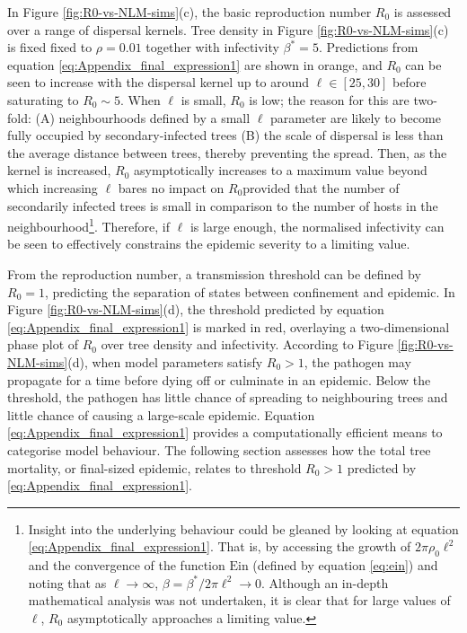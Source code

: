 In Figure \ref{fig:R0-vs-NLM-sims}(c), the basic reproduction number $R_0$ is assessed over a range of dispersal kernels.
Tree density in Figure \ref{fig:R0-vs-NLM-sims}(c) is fixed fixed to $\rho=0.01$ together with infectivity $\beta^*=5$.
Predictions from equation \ref{eq:Appendix_final_expression1} are shown in orange,
and $R_0$ can be seen to increase with the dispersal kernel up to around $\ell \in [25, 30]$ before saturating to $R_0 \sim 5$. 
When $\ell$ is small, $R_0$ is low; the reason for this are two-fold: 
(A) neighbourhoods defined by a small $\ell$ parameter are likely to become fully occupied by secondary-infected trees
(B) the scale of dispersal is less than the average distance between trees, thereby preventing the spread.
Then, as the kernel is increased, $R_0$ asymptotically increases to a maximum value beyond which increasing $\ell$ bares no impact on $R_0$\textemdash provided that the number of secondarily infected trees is small in comparison to the number of hosts in the neighbourhood\footnote{Insight into the underlying behaviour could be gleaned by looking at equation \ref{eq:Appendix_final_expression1}. That is, by accessing the growth of $2\pi \rho_0 \ell^2$ and the convergence of the function $\mathrm{Ein}$ (defined by equation \ref{eq:ein}) and noting that as $\ell \rightarrow \infty$, $\beta=\beta^*/2\pi\ell^2 \rightarrow 0$. Although an in-depth mathematical analysis was not undertaken, it is clear that for large values of $\ell$, $R_0$ asymptotically approaches a limiting value.}.
Therefore, if $\ell$ is large enough, the normalised infectivity can be seen to effectively constrains the epidemic severity to a limiting value.

From the reproduction number, a transmission threshold can be defined by $R_0=1$,  predicting the separation of states between confinement and epidemic.
In Figure \ref{fig:R0-vs-NLM-sims}(d), the threshold predicted by equation \ref{eq:Appendix_final_expression1} is marked in red, overlaying a two-dimensional phase plot of $R_0$ over tree density and infectivity.
According to Figure \ref{fig:R0-vs-NLM-sims}(d), when model parameters satisfy $R_0>1$, the pathogen may propagate for a time before dying off or culminate in an epidemic.
Below the threshold, the pathogen has little chance of spreading to neighbouring trees and little chance of causing a large-scale epidemic.
Equation \ref{eq:Appendix_final_expression1} provides a computationally efficient means to categorise model behaviour.
The following section assesses how the total tree mortality, or final-sized epidemic, relates to threshold $R_0>1$  predicted by \ref{eq:Appendix_final_expression1}.


